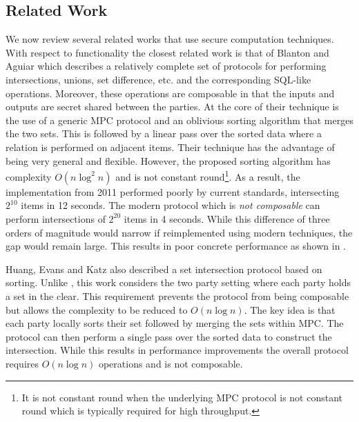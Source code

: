 \subsection{Related Work}
We now review several related works that use secure computation techniques. With respect to functionality the closest related work is that of Blanton and Aguiar\cite{ASIACCS:BlaAgu12} which describes a relatively complete set of protocols for performing intersections, unions, set difference, etc. and the corresponding SQL-like operations. Moreover, these operations are composable in that the inputs and outputs are secret shared between the parties. At the core of their technique is the use of a generic MPC protocol and an oblivious sorting algorithm that merges the two sets. This is followed by a linear pass over the sorted data where a relation is performed on adjacent items. Their technique has the advantage of being very general and flexible. However, the proposed sorting algorithm has complexity $O(n \log^2 n)$ and is not constant round\footnote{It is not constant round when the underlying MPC protocol is not constant round which is typically required for high throughput.}. 
\iffullversion
As a result, the implementation from 2011 performed poorly by current standards, intersecting $2^{10}$ items in 12 seconds. The modern protocol \cite{CCS:KKRT16} which is \emph{not composable} can perform intersections of $2^{20}$ items in 4 seconds. While this difference of three orders of magnitude would narrow if reimplemented using modern techniques, the gap would remain large.
\else
This results in poor concrete performance as shown in .
\fi


\iffullversion
Huang, Evans and Katz\cite{HEK12} also described a set intersection protocol based on sorting. Unlike \cite{ASIACCS:BlaAgu12}, this work considers the two party setting where each party holds a set in the clear.
This requirement prevents the protocol from being composable but allows the complexity to be reduced to $O(n\log n)$. The key idea is that each party locally sorts their set followed by merging the sets within MPC. The protocol can then perform a single pass over the sorted data to construct the intersection. While this results in performance improvements the overall protocol requires  $O(n\log n)$ operations and is not composable.
\fi

